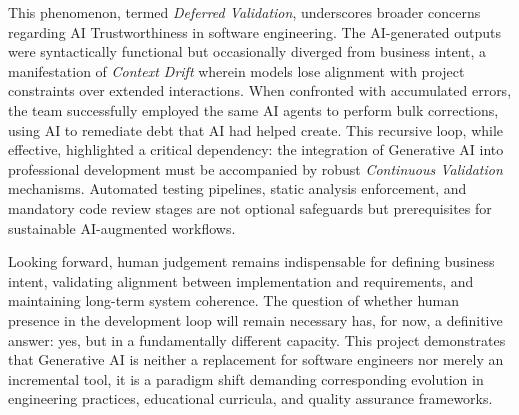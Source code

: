\documentclass[a4paper,12pt]{report}
\begin{document}
This phenomenon, termed \textit{Deferred Validation}, underscores broader concerns regarding AI Trustworthiness in software engineering. The AI-generated outputs were syntactically functional but occasionally diverged from business intent, a manifestation of \textit{Context Drift} wherein models lose alignment with project constraints over extended interactions. When confronted with accumulated errors, the team successfully employed the same AI agents to perform bulk corrections, using AI to remediate debt that AI had helped create. This recursive loop, while effective, highlighted a critical dependency: the integration of Generative AI into professional development must be accompanied by robust \textit{Continuous Validation} mechanisms. Automated testing pipelines, static analysis enforcement, and mandatory code review stages are not optional safeguards but prerequisites for sustainable AI-augmented workflows.

Looking forward, human judgement remains indispensable for defining business intent, validating alignment between implementation and requirements, and maintaining long-term system coherence. The question of whether human presence in the development loop will remain necessary has, for now, a definitive answer: yes, but in a fundamentally different capacity. This project demonstrates that Generative AI is neither a replacement for software engineers nor merely an incremental tool, it is a paradigm shift demanding corresponding evolution in engineering practices, educational curricula, and quality assurance frameworks.

\renewcommand{\bibname}{References}
\end{document}
